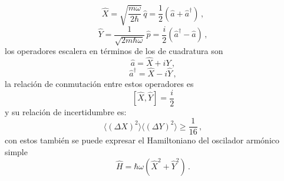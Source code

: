 \begin{equation}
  \label{OA.23}
  \hat{X} = \sqrt{\frac{m\omega}{2\hbar}} \, \hat{q} = \frac{1}{2}\left( \hat{a} + \hat{a}^{\dagger} \right)\,,
\end{equation}
\begin{equation}
  \label{OA.24}
  \hat{Y} = \frac{1}{\sqrt{2m\hbar\omega}} \, \hat{p} = \frac{i}{2}\left( \hat{a}^{\dagger} - \hat{a} \right)\,,
\end{equation}
los operadores escalera en términos de los de cuadratura son
\begin{equation}
  \label{OA.25}
  \hat{a} = \hat{X} + i{Y}\,,
\end{equation}
\begin{equation}
  \label{OA.26}
  \hat{a}^{\dagger} = \hat{X} - i\hat{Y}\,,
\end{equation}
la relación de conmutación entre estos operadores es
\begin{equation}
  \label{OA.27}
  \left[ \hat{X}, \hat{Y} \right] = \frac{i}{2}
\end{equation}
y su relación de incertidumbre es:
\begin{equation}
  \label{OA.28}
  \langle (\Delta X)^2 \rangle \langle (\Delta Y)^2 \rangle \geq \frac{1}{16}\,,
\end{equation}
con estos también se puede expresar el Hamiltoniano del oscilador armónico simple
\begin{equation}
  \label{OA.29}
  \hat{H} = \hbar \omega \left( \hat{X}^2 + \hat{Y}^2 \right)\,.
\end{equation}
